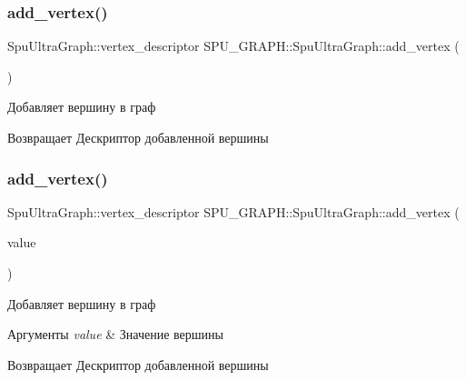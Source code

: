 \subsubsection{\texorpdfstring{add\+\_\+vertex()}{add\_vertex()}\hspace{0.1cm}{\footnotesize\ttfamily [1/4]}}
{\footnotesize\ttfamily Spu\+Ultra\+Graph\+::vertex\+\_\+descriptor S\+P\+U\+\_\+\+G\+R\+A\+P\+H\+::\+Spu\+Ultra\+Graph\+::add\+\_\+vertex (\begin{DoxyParamCaption}{ }\end{DoxyParamCaption})}

Добавляет вершину в граф \begin{DoxyReturn}{Возвращает}
Дескриптор добавленной вершины 
\end{DoxyReturn}
\mbox{\label{class_s_p_u___g_r_a_p_h_1_1_spu_ultra_graph_a8c5c1c97abc61017a5e188cd7975e688}} 
\subsubsection{\texorpdfstring{add\+\_\+vertex()}{add\_vertex()}\hspace{0.1cm}{\footnotesize\ttfamily [2/4]}}
{\footnotesize\ttfamily Spu\+Ultra\+Graph\+::vertex\+\_\+descriptor S\+P\+U\+\_\+\+G\+R\+A\+P\+H\+::\+Spu\+Ultra\+Graph\+::add\+\_\+vertex (\begin{DoxyParamCaption}\item[{value\+\_\+t}]{value }\end{DoxyParamCaption})}

Добавляет вершину в граф 
\begin{DoxyParams}{Аргументы}
{\em value} & Значение вершины \\
\hline
\end{DoxyParams}
\begin{DoxyReturn}{Возвращает}
Дескриптор добавленной вершины 
\end{DoxyReturn}
\mbox{\label{class_s_p_u___g_r_a_p_h_1_1_spu_ultra_graph_a0ab2bed50a562ddb4b3a3718cf7a50ab}} 
